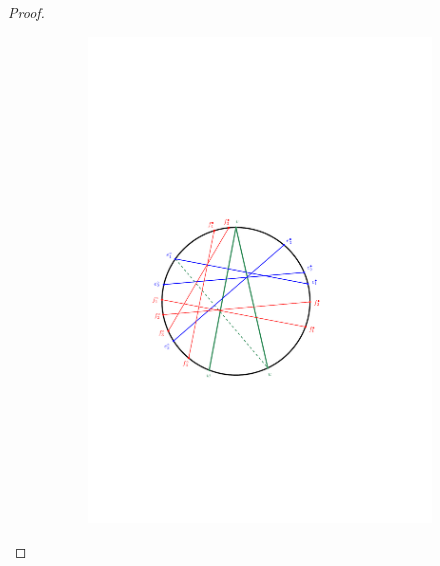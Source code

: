 \documentclass{amsart}
\theoremstyle{remark}
\begin{document}
\begin{proof}
\begin{figure}
  \centering
  \begin{subfigure}[b]{.48\textwidth}
	\centering
	\includegraphics[width=\textwidth,page=1]{exProofStar}
  \end{subfigure}
  \begin{subfigure}[b]{.48\textwidth}
    \centering

\end{subfigure}
\end{figure}
\end{proof}
\end{document}
